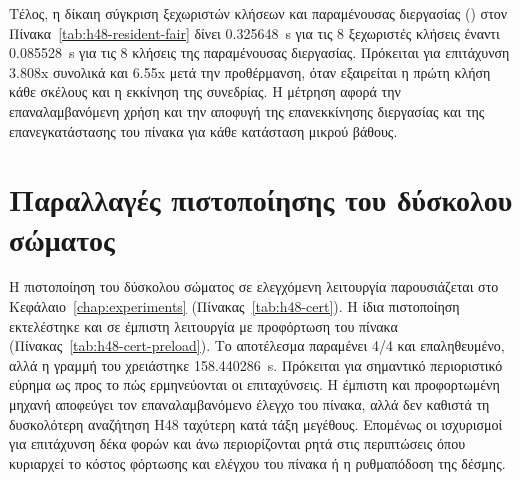 \begin{table}[htbp]\centering

\caption[Δίκαιη μέτρηση του κόστους δέσμης με έμπιστο πίνακα]{Δίκαιη μέτρηση του κόστους δέσμης με έμπιστο πίνακα  (κοινή προθέρμανση, 12 επαναλήψεις): ξεχωριστές διεργασίες έναντι μίας δέσμης με τον πίνακα φορτωμένο μία φορά. Πηγή: .}
\label{tab:h48-batch-fair}
\end{table}

Τέλος, η δίκαιη σύγκριση ξεχωριστών κλήσεων και παραμένουσας διεργασίας () στον Πίνακα~\ref{tab:h48-resident-fair} δίνει 0.325648~s για τις 8 ξεχωριστές κλήσεις έναντι 0.085528~s για τις 8 κλήσεις της παραμένουσας διεργασίας. Πρόκειται για επιτάχυνση 3.808x συνολικά και 6.55x μετά την προθέρμανση, όταν εξαιρείται η πρώτη κλήση κάθε σκέλους και η εκκίνηση της συνεδρίας. Η μέτρηση αφορά την επαναλαμβανόμενη χρήση και την αποφυγή της επανεκκίνησης διεργασίας και της επανεγκατάστασης του πίνακα για κάθε κατάσταση μικρού βάθους.

\begin{table}[htbp]\centering

\caption[Δίκαιη σύγκριση ξεχωριστών και παραμένουσας διεργασίας]{Δίκαιη σύγκριση ξεχωριστών διεργασιών σε C/C++ και μίας παραμένουσας τέτοιας διεργασίας για επαναλαμβανόμενες κλήσεις με έμπιστο πίνακα  (κοινή προθέρμανση, 8 επαναλήψεις). Πηγή: .}
\label{tab:h48-resident-fair}
\end{table}

\section{Παραλλαγές πιστοποίησης του δύσκολου σώματος}
\label{sec:h48eng-cert-variants}

Η πιστοποίηση του δύσκολου σώματος σε ελεγχόμενη λειτουργία παρουσιάζεται στο Κεφάλαιο~\ref{chap:experiments} (Πίνακας~\ref{tab:h48-cert}). Η ίδια πιστοποίηση εκτελέστηκε και σε έμπιστη λειτουργία με προφόρτωση του πίνακα (Πίνακας~\ref{tab:h48-cert-preload}). Το αποτέλεσμα παραμένει 4/4  και επαληθευμένο, αλλά η γραμμή του  χρειάστηκε 158.440286~s. Πρόκειται για σημαντικό περιοριστικό εύρημα ως προς το πώς ερμηνεύονται οι επιταχύνσεις. Η έμπιστη και προφορτωμένη μηχανή αποφεύγει τον επαναλαμβανόμενο έλεγχο του πίνακα, αλλά δεν καθιστά τη δυσκολότερη αναζήτηση H48 ταχύτερη κατά τάξη μεγέθους. Επομένως οι ισχυρισμοί για επιτάχυνση δέκα φορών και άνω περιορίζονται ρητά στις περιπτώσεις όπου κυριαρχεί το κόστος φόρτωσης και ελέγχου του πίνακα ή η ρυθμαπόδοση της δέσμης.

